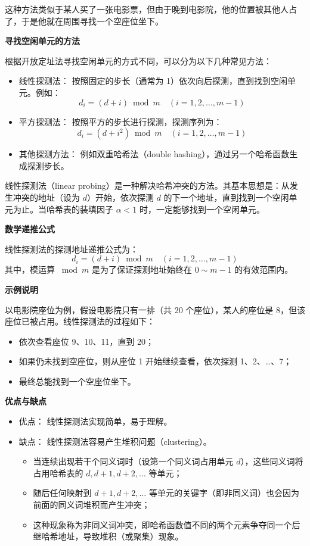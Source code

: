 \documentclass[lang=cn,newtx,10pt,scheme=chinese]{../elegantbook}
\begin{document}
这种方法类似于某人买了一张电影票，但由于晚到电影院，他的位置被其他人占了，于是他就在周围寻找一个空座位坐下。


\textbf{寻找空闲单元的方法}  

根据开放定址法寻找空闲单元的方式不同，可以分为以下几种常见方法：
\begin{itemize}
  \item 线性探测法：  
    按照固定的步长（通常为 1）依次向后探测，直到找到空闲单元。例如：
    \[
    d_i = (d + i) \bmod m \quad (i = 1, 2, \dots, m-1)
    \]
  \item 平方探测法：  
    按照平方的步长进行探测，探测序列为：
    \[
    d_i = (d + i^2) \bmod m \quad (i = 1, 2, \dots, m-1)
    \]
  \item 其他探测方法：  
    例如双重哈希法（double hashing），通过另一个哈希函数生成探测步长。
\end{itemize}

线性探测法（linear probing）是一种解决哈希冲突的方法。其基本思想是：从发生冲突的地址（设为 $d$）开始，依次探测 $d$ 的下一个地址，直到找到一个空闲单元为止。当哈希表的装填因子 $\alpha < 1$ 时，一定能够找到一个空闲单元。


\textbf{数学递推公式}  

线性探测法的探测地址递推公式为：
\[
d_i = (d + i) \bmod m \quad (i = 1, 2, \dots, m-1)
\]
其中，模运算 $\bmod m$ 是为了保证探测地址始终在 $0 \sim m-1$ 的有效范围内。


\textbf{示例说明}  

以电影院座位为例，假设电影院只有一排（共 20 个座位），某人的座位是 8，但该座位已被占用。线性探测法的过程如下：
\begin{itemize}
  \item 依次查看座位 9、10、11，直到 20；
  \item 如果仍未找到空座位，则从座位 1 开始继续查看，依次探测 1、2、…、7；
  \item 最终总能找到一个空座位坐下。
\end{itemize}


\textbf{优点与缺点}  

\begin{itemize}
  \item 优点：  
    线性探测法实现简单，易于理解。
  \item 缺点：  
    线性探测法容易产生堆积问题（clustering）。  
    \begin{itemize}
      \item 当连续出现若干个同义词时（设第一个同义词占用单元 $d$），这些同义词将占用哈希表的 $d, d+1, d+2, \dots$ 等单元；
      \item 随后任何映射到 $d+1, d+2, \dots$ 等单元的关键字（即非同义词）也会因为前面的同义词堆积而产生冲突；
      \item 这种现象称为非同义词冲突，即哈希函数值不同的两个元素争夺同一个后继哈希地址，导致堆积（或聚集）现象。
    \end{itemize}
\end{itemize}
\end{document}
